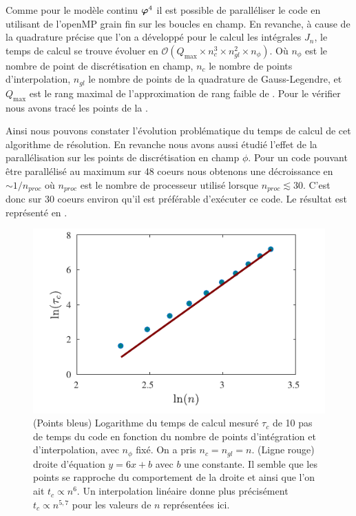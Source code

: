 \documentclass[10.5pt]{article}
\begin{document}
\begin{multicols}{2}
Comme pour le modèle continu $\boldsymbol{ \varphi}^4$ il est possible de paralléliser le code en utilisant de l'openMP \cite{openmp2002c++} grain fin sur les boucles en champ. En revanche, à cause de la quadrature précise que l'on a développé pour le calcul les intégrales $J_n$, le temps de calcul se trouve évoluer en $\mathcal{O}( Q_\text{max} \times n_c^3 \times n_{gl}^2 \times n_{\phi})$. Où $n_{\phi}$ est le nombre de point de discrétisation en champ, $n_c$ le nombre de points d'interpolation, $n_{{gl}}$ le nombre de points de la quadrature de Gauss-Legendre, et $Q_{\text{max}}$ est le rang maximal de l'approximation de rang faible de . Pour le vérifier nous avons tracé les points de la .


Ainsi nous pouvons constater l'évolution problématique du temps de calcul de cet algorithme de résolution. En revanche nous avons aussi étudié l'effet de la parallélisation sur les points de discrétisation en champ $\phi$. Pour un code pouvant être parallélisé au maximum sur 48 coeurs nous obtenons une décroissance en $\sim 1/n_{proc}$ où $n_{proc}$ est le nombre de processeur utilisé lorsque $n_{proc} \lesssim 30$. C'est donc sur $30$ coeurs environ qu'il est préférable d'exécuter ce code. Le résultat est représenté en  .\\


\begin{figure}[H]
\begin{center}
	\includegraphics[width=0.95\columnwidth]{ComplexiteTemps.pdf}
\end{center}
\caption{(Points bleus) Logarithme du temps de calcul mesuré $\tau_c$ de 10 pas de temps du code en fonction du nombre de points d'intégration et d'interpolation, avec $n_\phi$ fixé. On a pris $n_c = n_{gl} = n$. (Ligne rouge) droite d'équation $y=6x+b$ avec $b$ une constante. Il semble que les points se rapproche du comportement de la droite et ainsi que l'on ait $t_c \propto n^6$. Un interpolation linéaire donne plus précisément $t_c \propto n^{5,7}$ pour les valeurs de $n$ représentées ici.}
\label{fig:timeNc}
\end{figure}




\end{multicols}
\end{document}
